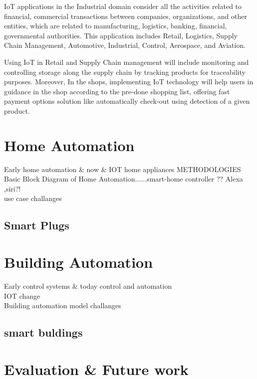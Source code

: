 \documentclass[conference]{IEEEtran}
\begin{document}
IoT applications in the Industrial domain consider all the activities related to financial, commercial transactions between companies, organizations, and other entities, which are related to manufacturing, logistics, banking, financial, governmental authorities. This application includes Retail, Logistics, Supply Chain Management, Automotive, Industrial,
Control, Aerospace, and Aviation. 

Using  IoT in Retail and Supply Chain management will include monitoring and controlling storage along the supply chain by tracking products for traceability purposes. Moreover,  In the shops, implementing IoT technology will help users in guidance in the shop according to the pre-done shopping list, offering fast payment options solution 
like automatically check-out using detection of a given product. 



\section{Home Automation}

 
Early home automation  \& now \& IOT home appliances 
METHODOLOGIES 
Basic Block Diagram of Home Automation......smart-home controller ?? Alexa ,siri?!
\\use case 
challanges 

\subsection{Smart Plugs}






\section{Building  Automation }

Early control systems \& today control and automation \\ IOT change \\

Building automation model
challanges 

\subsection{smart buldings}

\section{Evaluation \& Future work   }
\end{document}
